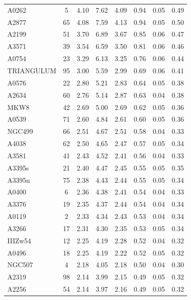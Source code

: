 \documentclass[10pt,aps,pra,reprint,amsmath,amsfonts,amssymb,showpacs,nofootinbib,floatfix]{revtex4-1}
\begin{document}
\begin{table}
\begin{minipage}{2.0\columnwidth}
\begin{tabular}{l  c c c c c c c}
A0262    &   5 &   4.10 &   7.62 &   4.09 &   0.94 &   0.05 &   0.49 \\
A2877    &  65 &   4.08 &   7.59 &   4.13 &   0.94 &   0.05 &   0.50 \\
A2199    &  51 &   3.70 &   6.89 &   3.67 &   0.85 &   0.06 &   0.47 \\
A3571    &  39 &   3.54 &   6.59 &   3.50 &   0.81 &   0.06 &   0.46 \\
A0754    &  23 &   3.29 &   6.13 &   3.25 &   0.76 &   0.06 &   0.44 \\
TRIANGULUM &  95 &   3.00 &   5.59 &   2.99 &   0.69 &   0.06 &   0.41 \\
A0576    &  22 &   2.80 &   5.21 &   2.83 &   0.64 &   0.05 &   0.38 \\
A2634    &  60 &   2.76 &   5.14 &   2.87 &   0.63 &   0.04 &   0.38 \\
MKW8     &  42 &   2.69 &   5.00 &   2.69 &   0.62 &   0.05 &   0.36 \\
A0539    &  71 &   2.60 &   4.84 &   2.61 &   0.60 &   0.05 &   0.36 \\
NGC499   &  66 &   2.51 &   4.67 &   2.51 &   0.58 &   0.04 &   0.33 \\
A4038    &  62 &   2.50 &   4.65 &   2.47 &   0.57 &   0.05 &   0.34 \\
A3581    &  41 &   2.43 &   4.52 &   2.41 &   0.56 &   0.04 &   0.33 \\
A3395s   &  21 &   2.40 &   4.47 &   2.45 &   0.55 &   0.05 &   0.35 \\
A3395n   &  75 &   2.38 &   4.43 &   2.44 &   0.55 &   0.05 &   0.34 \\
A0400    &   6 &   2.36 &   4.38 &   2.41 &   0.54 &   0.04 &   0.33 \\
A3376    &  19 &   2.35 &   4.37 &   2.44 &   0.54 &   0.04 &   0.34 \\
A0119    &   2 &   2.33 &   4.34 &   2.43 &   0.53 &   0.04 &   0.34 \\
A3266    &  17 &   2.31 &   4.30 &   2.35 &   0.53 &   0.05 &   0.34 \\
IIIZw54  &  12 &   2.25 &   4.19 &   2.28 &   0.52 &   0.04 &   0.32 \\
A0496    &  18 &   2.25 &   4.19 &   2.22 &   0.52 &   0.05 &   0.32 \\
NGC507   &   4 &   2.18 &   4.05 &   2.18 &   0.50 &   0.04 &   0.30 \\
A2319    &  98 &   2.14 &   3.99 &   2.15 &   0.49 &   0.05 &   0.32 \\
A2256    &  54 &   2.14 &   3.97 &   2.16 &   0.49 &   0.05 &   0.32 \\

\end{tabular}
\end{minipage}
\end{table}
\end{document}
